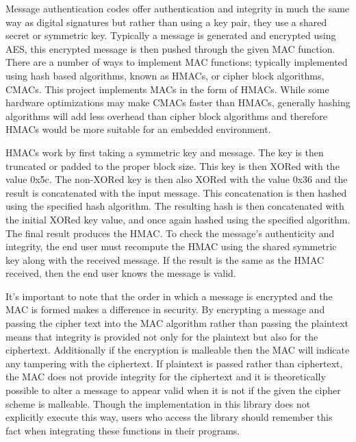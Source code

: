 Message authentication codes offer authentication and integrity in much the same way as digital signatures but rather than using a key pair, they use a shared secret or symmetric key. Typically a message is generated and encrypted using AES, this encrypted message is then pushed through the given MAC function. There are a number of ways to implement MAC functions; typically implemented using hash based algorithms, known as HMACs, or cipher block algorithms, CMACs. This project implements MACs in the form of HMACs. While some hardware optimizations may make CMACs faster than HMACs, generally hashing algorithms will add less overhead than cipher block algorithms and therefore HMACs would be more suitable for an embedded environment. 

HMACs work by first taking a symmetric key and message. The key is then truncated or padded to the proper block size. This key is then XORed with the value 0x5c. The non-XORed key is then also XORed with the value 0x36 and the result is concatenated with the input  message. This concatenation is then hashed using the specified hash algorithm. The resulting hash is then concatenated with the initial XORed key value, and once again hashed using the specified algorithm. The final result produces the HMAC. To check the message's authenticity and integrity, the end user must recompute the HMAC using the shared symmetric key along with the received message. If the result is the same as the HMAC received, then the end user knows the message is valid.

It's important to note that the order in which a message is encrypted and the MAC is formed makes a difference in security. By encrypting a message and passing the cipher text into the MAC algorithm rather than passing the plaintext means that integrity is provided not only for the plaintext but also for the ciphertext. Additionally if the encryption is malleable then the MAC will indicate any tampering with the ciphertext. If plaintext is passed rather than ciphertext, the MAC does not provide integrity for the ciphertext and it is theoretically possible to alter a message to appear valid when it is not if the given the cipher scheme is malleable.  Though the implementation in this library does not explicitly execute this way, users who access the library should remember this fact when integrating these functions in their programs.

